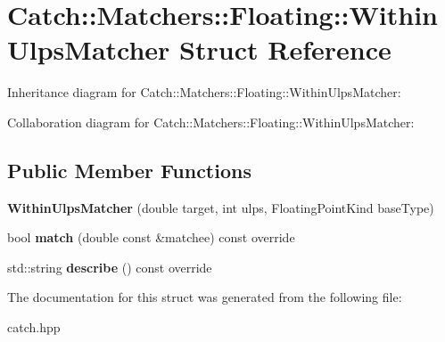 \hypertarget{structCatch_1_1Matchers_1_1Floating_1_1WithinUlpsMatcher}{}\section{Catch\+:\+:Matchers\+:\+:Floating\+:\+:Within\+Ulps\+Matcher Struct Reference}
\label{structCatch_1_1Matchers_1_1Floating_1_1WithinUlpsMatcher}


Inheritance diagram for Catch\+:\+:Matchers\+:\+:Floating\+:\+:Within\+Ulps\+Matcher\+:


Collaboration diagram for Catch\+:\+:Matchers\+:\+:Floating\+:\+:Within\+Ulps\+Matcher\+:
\subsection*{Public Member Functions}
\begin{DoxyCompactItemize}
\item 
{\bfseries Within\+Ulps\+Matcher} (double target, int ulps, Floating\+Point\+Kind base\+Type)\hypertarget{structCatch_1_1Matchers_1_1Floating_1_1WithinUlpsMatcher_a836074ae4010275284ab66b2485c6575}{}\label{structCatch_1_1Matchers_1_1Floating_1_1WithinUlpsMatcher_a836074ae4010275284ab66b2485c6575}

\item 
bool {\bfseries match} (double const \&matchee) const override\hypertarget{structCatch_1_1Matchers_1_1Floating_1_1WithinUlpsMatcher_aabda42a0dc5d00f3c5916feb75006b32}{}\label{structCatch_1_1Matchers_1_1Floating_1_1WithinUlpsMatcher_aabda42a0dc5d00f3c5916feb75006b32}

\item 
std\+::string {\bfseries describe} () const override\hypertarget{structCatch_1_1Matchers_1_1Floating_1_1WithinUlpsMatcher_ad9bc8bb7f3abd326580a4bf6cf369b1b}{}\label{structCatch_1_1Matchers_1_1Floating_1_1WithinUlpsMatcher_ad9bc8bb7f3abd326580a4bf6cf369b1b}

\end{DoxyCompactItemize}


The documentation for this struct was generated from the following file\+:\begin{DoxyCompactItemize}
\item 
catch.\+hpp\end{DoxyCompactItemize}
